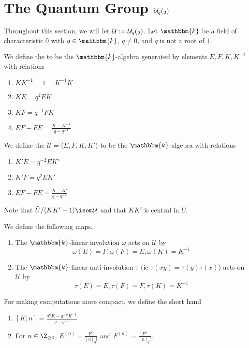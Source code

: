 \documentclass[11pt,leqno,oneside]{amsbook}
\numberwithin{thm}{section}
\newcommand{\U}{\mathcal{U}}
\newcommand{\qfactorial}[1]{[#1]_q!}
\renewcommand{\k}{\mathbbm{k}}
\begin{document}
\section{The Quantum Group \(\U_q(\sl_2)\)}
Throughout this section, we will let \(\U := \U_q(\sl_2)\). Let \(\k\)
be a field of characteristic \(0\) with \(q \in \k\), \(q \neq 0\),
and \(q\) is not a root of \(1\).
\begin{defn}
  We define the \de{quantum group \(\U := \U_q(\sl_2)\)} to be the \(\k\)-algebra
  generated by elements \(E,F,K,K^{-1}\) with relations
  \begin{enumerate}
  \item \(KK^{-1} = 1 = K^{-1}K\)
  \item \(KE = q^2 EK\)
  \item \(KF = q^{-1}FK\)
  \item \(EF-FE = \frac{K-K^{-1}}{q-q^{-1}}\)
  \end{enumerate}
\end{defn}
\begin{defn}
  We define the  \(\tilde{\U} = \langle E,F,K,K' \rangle\) to be the
  \(\k\)-algebra with relations
  \begin{enumerate}
  \item \(K'E = q^{-2}EK'\)
  \item \(K'F = q^2 EK'\)
  \item \(EF-FE = \frac{K-K'}{q-q^{-1}}\)
  \end{enumerate}
\end{defn}
\begin{rmk}
  Note that \(\tilde{U}/\langle KK'-1 \rangle \isom \U\) and that
  \(KK'\) is central in \(\tilde{U}\).
\end{rmk}
\begin{defn}
  We define the following maps.
  \begin{enumerate}
  \item The \(\k\)-linear involution \(\omega\) acts on \(\U\) by
    \[
      \omega(E) = F, \omega(F) = E, \omega(K) = K^{-1}
    \]
  \item The \(\k\)-linear anti-involution \(\tau\) (ie \(\tau(xy) =
    \tau(y)\tau(x)\)) acts on \(\U\) by \[
      \tau(E) = E, \tau(F) = F, \tau(K) = K^{-1}
    \]
  \end{enumerate}
\end{defn}
\begin{defn}
  For making computations more compact, we define the short hand
  \begin{enumerate}
  \item \([K;n] = \frac{q^n K-q^{-n}K^{-1}}{q-q^{-1}}\)
  \item For \(n \in \Z_{\geq 0}\), \(E^{(n)} =
    \frac{E^n}{\qfactorial{n}}\) and \(F^{(n)} =
    \frac{F^n}{\qfactorial{n}}\). 
  \end{enumerate}
\end{defn}
\end{document}

